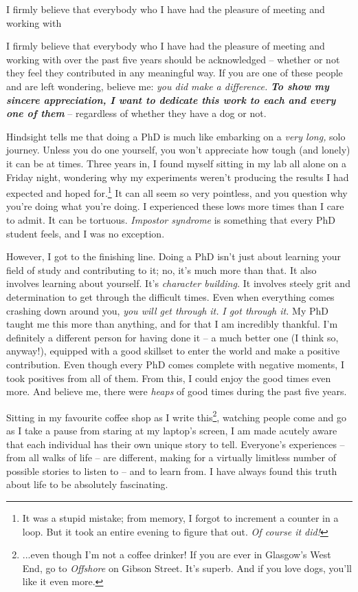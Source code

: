 \begin{preamble}
I firmly believe that everybody who I have had the pleasure of meeting and working with 


\todo{=====}


I firmly believe that everybody who I have had the pleasure of meeting and working with over the past five years should be acknowledged -- whether or not they feel they contributed in any meaningful way. If you are one of these people and are left wondering, believe me: \emph{you did make a difference.} \textbf{\emph{To show my sincere appreciation, I want to dedicate this work to each and every one of them}} -- regardless of whether they have a dog or not.

Hindsight tells me that doing a PhD is much like embarking on a \emph{very long,} solo journey. Unless you do one yourself, you won't appreciate how tough (and lonely) it can be at times. Three years in, I found myself sitting in my lab all alone on a Friday night, wondering why my experiments weren't producing the results I had expected and hoped for.\footnote{It was a stupid mistake; from memory, I forgot to increment a counter in a loop. But it took an entire evening to figure that out. \emph{Of course it did!}} It can all seem so very pointless, and you question why you're doing what you're doing. I experienced these lows more times than I care to admit. It can be tortuous. \emph{Impostor syndrome} is something that every PhD student feels, and I was no exception.

However, I got to the finishing line. Doing a PhD isn't just about learning your field of study and contributing to it; no, it's much more than that. It also involves learning about yourself. It's \emph{character building.} It involves steely grit and determination to get through the difficult times. Even when everything comes crashing down around you, \emph{you will get through it.} \emph{I got through it.} My PhD taught me this more than anything, and for that I am incredibly thankful. I'm definitely a different person for having done it -- a much better one (I think so, anyway!), equipped with a good skillset to enter the world and make a positive contribution. Even though every PhD comes complete with negative moments, I took positives from all of them. From this, I could enjoy the good times even more. And believe me, there were \emph{heaps} of good times during the past five years.

Sitting in my favourite coffee shop as I write this\footnote{...even though I'm not a coffee drinker! If you are ever in Glasgow's West End, go to \emph{Offshore} on Gibson Street. It's superb. And if you love dogs, you'll like it even more.}, watching people come and go as I take a pause from staring at my laptop's screen, I am made acutely aware that each individual has their own unique story to tell. Everyone's experiences -- from all walks of life -- are different, making for a virtually limitless number of possible stories to listen to -- and to learn from. I have always found this truth about life to be absolutely fascinating.


\end{preamble}

